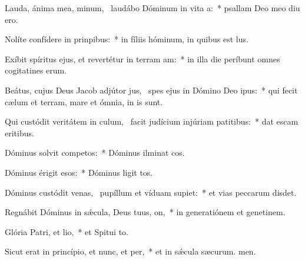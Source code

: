 \item Lauda, ánima mea, minum,~\pscross{} laudábo Dóminum in vita a:~* psallam Deo meo diu ero.
\item Nolíte confídere in prinpibus:~* in fíliis hóminum, in quibus  est lus.
\item Exíbit spíritus ejus, et revertétur in terram am:~* in illa die períbunt omnes cogitatines erum.
\item Beátus, cujus Deus Jacob adjútor jus,~\pscross{} spes ejus in Dómino Deo ipus:~* qui fecit cælum et terram, mare et ómnia,  in is sunt.
\item Qui custódit veritátem in culum,~\pscross{} facit judícium injúriam patitibus:~* dat escam eritibus.
\item Dóminus solvit competos:~* Dóminus ilminat cos.
\item Dóminus érigit esos:~* Dóminus ligit tos.
\item Dóminus custódit venas,~\pscross{} pupíllum et víduam supiet:~* et vias peccarum disdet.
\item Regnábit Dóminus in sǽcula, Deus tuus, on,~* in generatiónem et genetinem.
\item Glória Patri, et lio,~* et Spitui to.
\item Sicut erat in princípio, et nunc, et per,~* et in sǽcula sæcurum. men.
